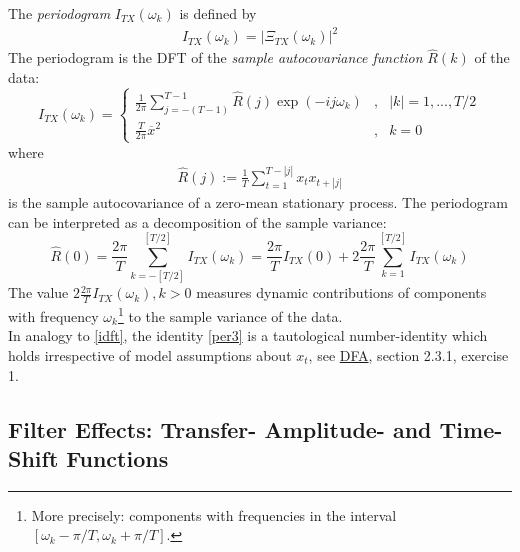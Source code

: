 \documentclass[a4paper]{book}
\begin{document}
The \emph{periodogram} $I_{TX}(\omega_k)$ is defined by
\begin{eqnarray}\label{per_def}
I_{TX}(\omega_k)=\left|\Xi_{TX}(\omega_k)\right|^2
\end{eqnarray}
The periodogram is the DFT of the \emph{sample autocovariance function} $\hat{R}(k)$ of the data:
\begin{equation}\label{per3}
I_{TX}(\omega_k)= \left\{\begin{array}{ccc}\displaystyle{
\frac{1}{2\pi} \sum_{j=-(T-1)}^{T-1} \hat{R}(j) \exp(-ij\omega_k)}&,&|k|=1,...,T/2\\
\displaystyle{\frac{T}{2\pi}}\overline{x}^2&,&k=0 \end{array}\right.\end{equation}
where
\begin{eqnarray}\label{rhat}
\hat{R}(j):=\frac{1}{T}\sum_{t=1}^{T-|j|}x_tx_{t+|j|}
\end{eqnarray}
is the sample autocovariance of a zero-mean stationary process. The periodogram can be interpreted as a decomposition  of the sample variance:
\begin{equation}\label{spec_dec_per}
\hat{R}(0)=\frac{2\pi}{T} \sum_{k=-[T/2]}^{[T/2]} I_{TX}(\omega_k) =\frac{2\pi}{T}I_{TX}(0)+2\frac{2\pi}{T} \sum_{k=1}^{[T/2]} I_{TX}(\omega_k)
\end{equation}
The value $2\frac{2\pi}{T}I_{TX}(\omega_k), k>0$ measures dynamic contributions  of components with frequency $\omega_k$\footnote{More precisely: components with frequencies in the interval $[\omega_k-\pi/T,\omega_k+\pi/T]$.} to the sample variance of the data.\\

In analogy to \ref{idft}, the identity \ref{per3} is a tautological number-identity which holds irrespective of model assumptions about $x_t$, see \href{http://blog.zhaw.ch/sef/files/2014/10/DFA.pdf}{DFA}, section 2.3.1, exercise 1. 


\subsection{Filter Effects: Transfer- Amplitude- and Time-Shift Functions}
\end{document}
